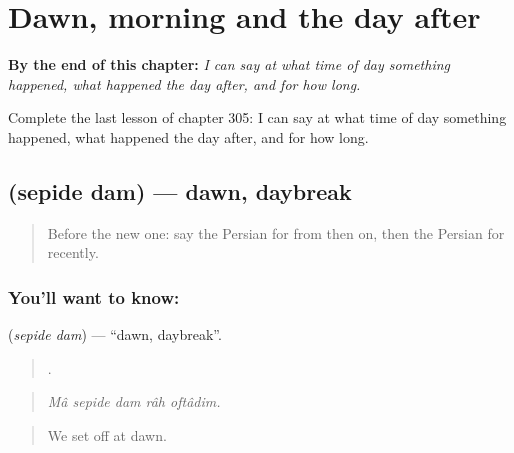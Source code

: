 
\chapter{Dawn, morning and the day after}
\label{ch:fa-dawn-morning-and-the-day-after}

\begin{chapteropening}
\textbf{By the end of this chapter:} \emph{I can say at what time of day something happened, what happened the day after, and for how long.}

Complete the last lesson of chapter 305: I can say at what time of day something happened, what happened the day after, and for how long.
\end{chapteropening}

\section[\texorpdfstring{\fa{سپیده} \fa{دم} (sepide dam)}{سپیده دم (sepide dam)}]{  (sepide dam) — dawn, daybreak}

\label{lesson:FA-C305-sepide-dam}



\begin{quote}
Before the new one: say the Persian for from then on, then the Persian for recently.
\end{quote}

\subsection*{You'll want to know:  }
\textbf{ } (\emph{sepide dam}) — \textquotedblleft{}dawn, daybreak\textquotedblright{}.

\begin{quote}
    .
\end{quote}

\begin{quote}
\emph{Mâ sepide dam râh oftâdim.}
\end{quote}

\begin{quote}
We set off at dawn.
\end{quote}

